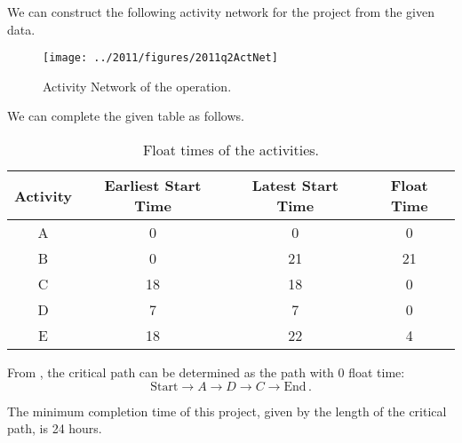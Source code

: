 \begin{subquestions}
\begin{subsubquestions}
	
\subsubquestion

We can construct the following activity network for the project from the given data.
\begin{figure}[H]
	\begin{center}
		\texttt{[image: ../2011/figures/2011q2ActNet]}
		\caption{\label{2011:q2:fig:ActNet} Activity Network of the operation.}
	\end{center}
\end{figure}


\subsubquestion

We can complete the given table as follows.
\begin{table}[h]
	\centering
	\begin{tabular}{|c|c|c|c|}
		\hline
		Activity & Earliest Start Time & Latest Start Time & Float Time \\
		\hline
		A & 0 & 0 & 0 \\
		B & 0 & 21 & 21 \\
		C & 18 & 18 & 0 \\
		D & 7 & 7 & 0 \\
		E & 18 & 22 & 4 \\
		\hline
	\end{tabular}
	\caption{\label{2011:q2:tab:Table1} Float times of the activities.}
\end{table}
	

\subsubquestion

\begin{subsubsubquestions}
	
\subsubsubquestion

From , the critical path can be determined as the path with 0 float time:
\begin{equation}
	\text{Start} \rightarrow A \rightarrow D \rightarrow C \rightarrow \text{End}\,.
\end{equation}


\subsubsubquestion

The minimum completion time of this project, given by the length of the critical path, is 24 hours.

\end{subsubsubquestions}

\end{subsubquestions}

\end{subquestions}


